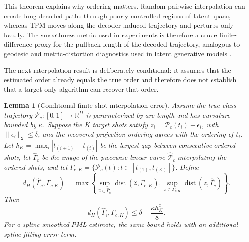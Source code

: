 \documentclass[preprint,12pt,number]{elsarticle}
\newtheorem{lemma}{Lemma}
\begin{document}
This theorem explains why ordering matters. Random pairwise interpolation can create long decoded paths through poorly controlled regions of latent space, whereas TPM moves along the decoder-induced trajectory and perturbs only locally. The smoothness metric used in experiments is therefore a crude finite-difference proxy for the pullback length of the decoded trajectory, analogous to geodesic and metric-distortion diagnostics used in latent generative models \citep{hauberg2015principal, arvanitidis2018latent, shao2018riemannian}.

The next interpolation result is deliberately conditional: it assumes that the estimated order already equals the true order and therefore does not establish that a target-only algorithm can recover that order.

\begin{lemma}[Conditional finite-shot interpolation error]
	Assume the true class trajectory $\mathcal{P}_c:[0,1]\rightarrow\mathbb{R}^D$ is parameterized by arc length and has curvature bounded by $\kappa$. Suppose the $K$ target shots satisfy $z_i=\mathcal{P}_c(t_i)+\epsilon_i$, with $\lVert\epsilon_i\rVert_2\le\delta$, and the recovered projection ordering agrees with the ordering of $t_i$. Let $h_K=\max_i |t_{(i+1)}-t_{(i)}|$ be the largest gap between consecutive ordered shots, let $\widehat{\Gamma}_c$ be the image of the piecewise-linear curve $\widehat{\mathcal{P}}_c$ interpolating the ordered shots, and let $\Gamma_{c,K}=\{\mathcal{P}_c(t):t\in[t_{(1)},t_{(K)}]\}$. Define
	\[
	d_H(\widehat{\Gamma}_c,\Gamma_{c,K})
	=
	\max\left\{
	\sup_{\hat z\in\widehat{\Gamma}_c}\operatorname{dist}(\hat z,\Gamma_{c,K}),
	\sup_{z\in\Gamma_{c,K}}\operatorname{dist}(z,\widehat{\Gamma}_c)
	\right\}.
	\]
	Then
	\[
	d_H(\widehat{\Gamma}_c,\Gamma_{c,K})
	\le \delta+\frac{\kappa h_K^2}{8}.
	\]
	For a spline-smoothed PML estimate, the same bound holds with an additional spline fitting error term.
\end{lemma}
\end{document}
